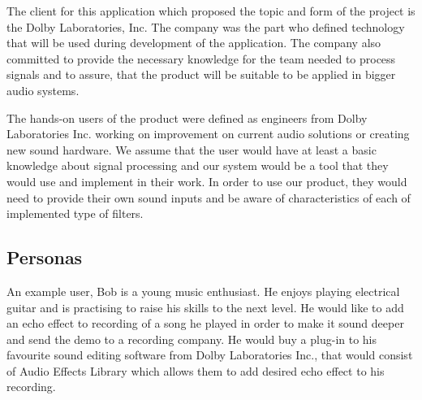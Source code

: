 \documentclass[12pt]{article}
\begin{document}
The client for this application which proposed the topic and form of the project is the Dolby Laboratories, Inc. The company was the part who defined technology that will be used during development of the application. The company also committed to provide the necessary knowledge for the team needed to process signals and to assure, that the product will be suitable to be applied in bigger audio systems.

The hands-on users of the product were defined as engineers from Dolby Laboratories Inc. working on improvement on current audio solutions or creating new sound hardware. We assume that the user would have at least a basic knowledge about signal processing and our system would be a tool that they would use and implement in their work. In order to use our product, they would need to provide their own sound inputs and be aware of characteristics of each of implemented type of filters.

\subsection{Personas}

An example user, Bob is a young music enthusiast. He enjoys playing electrical guitar and is practising to raise his skills to the next level. He would like to add an echo effect to recording of a song he played in order to make it sound deeper and send the demo to a recording company. He would buy a plug-in to his favourite sound editing software from Dolby Laboratories Inc., that would consist of Audio Effects Library which allows them to add desired echo effect to his recording.
\end{document}
